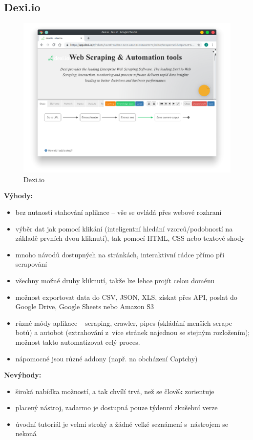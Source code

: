 \documentclass[thesis=B,czech]{FITthesis2}[2012/06/26]
\begin{document}
	
	\subsection{Dexi.io}
	\begin{figure}[h]
		\includegraphics[width=\linewidth]{images/Dexiio.png}
		\caption{Dexi.io\cite[snímek pořídil autor]{dexio}}
		\label{fig:dexi.io}
	\end{figure}
	\textbf{Výhody:}
	\begin{itemize}
		\item bez nutnosti stahování aplikace -- vše se ovládá přes webové rozhraní
		\item výběr dat jak pomocí klikání (inteligentní hledání vzorců/podobností na základě prvních dvou kliknutí), tak pomocí HTML, CSS nebo textové shody
		\item mnoho návodů dostupných na stránkách, interaktivní rádce přímo při scrapování
		\item všechny možné druhy kliknutí, takže lze lehce projít celou doménu
		\item možnost exportovat data do CSV, JSON, XLS, získat přes API, poslat do Google Drive, Google Sheets nebo Amazon S3
		\item různé módy aplikace -- scraping, crawler, pipes (skládání menších scrape botů) a autobot (extrahování z~více stránek najednou se stejným rozložením); možnost takto automatizovat celý proces.
		\item nápomocné jsou různé addony (např. na obcházení Captchy)
	\end{itemize}
	\textbf{Nevýhody:}
	\begin{itemize}
		\item široká nabídka možností, a tak chvílí trvá, než se člověk zorientuje
		\item placený nástroj, zadarmo je dostupná pouze týdenní zkušební verze
		\item úvodní tutoriál je velmi strohý a žádné velké seznámení s~nástrojem se nekoná
	\end{itemize}
	
\end{document}
